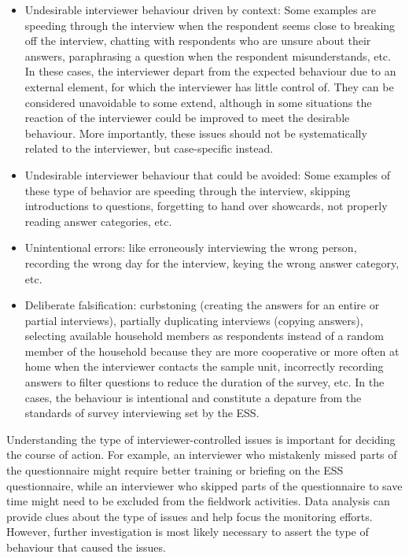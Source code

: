 \documentclass[
  11pt,
  a4paperpaper,
]{article}
\providecommand{\tightlist}{%
  \setlength{\itemsep}{0pt}\setlength{\parskip}{0pt}}
\begin{document}
\begin{itemize}
\tightlist
\item
  Undesirable interviewer behaviour driven by context: Some examples are
  speeding through the interview when the respondent seems close to
  breaking off the interview, chatting with respondents who are unsure
  about their answers, paraphrasing a question when the respondent
  misunderstands, etc. In these cases, the interviewer depart from the
  expected behaviour due to an external element, for which the
  interviewer has little control of. They can be considered unavoidable
  to some extend, although in some situations the reaction of the
  interviewer could be improved to meet the desirable behaviour. More
  importantly, these issues should not be systematically related to the
  interviewer, but case-specific instead.
\item
  Undesirable interviewer behaviour that could be avoided: Some examples
  of these type of behavior are speeding through the interview, skipping
  introductions to questions, forgetting to hand over showcards, not
  properly reading answer categories, etc.
\item
  Unintentional errors: like erroneously interviewing the wrong person,
  recording the wrong day for the interview, keying the wrong answer
  category, etc.
\item
  Deliberate falsification: curbstoning (creating the answers for an
  entire or partial interviews), partially duplicating interviews
  (copying answers), selecting available household members as
  respondents instead of a random member of the household because they
  are more cooperative or more often at home when the interviewer
  contacts the sample unit, incorrectly recording answers to filter
  questions to reduce the duration of the survey, etc. In the cases, the
  behaviour is intentional and constitute a depature from the standards
  of survey interviewing set by the ESS.
\end{itemize}

Understanding the type of interviewer-controlled issues is important for
deciding the course of action. For example, an interviewer who
mistakenly missed parts of the questionnaire might require better
training or briefing on the ESS questionnaire, while an interviewer who
skipped parts of the questionnaire to save time might need to be
excluded from the fieldwork activities. Data analysis can provide clues
about the type of issues and help focus the monitoring efforts. However,
further investigation is most likely necessary to assert the type of
behaviour that caused the issues.
\end{document}
